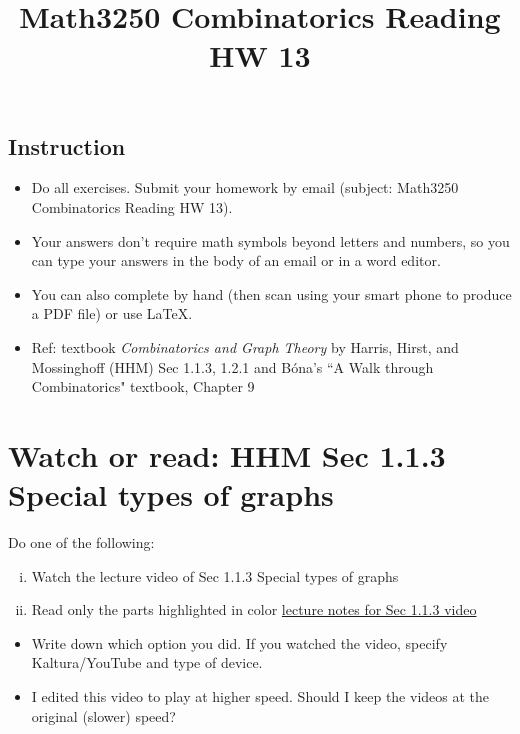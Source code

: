 \documentclass[11pt]{amsart}
\title{Math3250 Combinatorics Reading HW 13}
\begin{document}
\maketitle



\subsection*{Instruction}

\begin{itemize}
\item Do all exercises. 
Submit your homework by email (subject: Math3250 Combinatorics Reading HW 13). 
\item Your answers don't require math symbols beyond letters and numbers, so you can type your answers in the body of an email or in a word editor.
\item 
You can also complete by hand (then scan using your smart phone to produce a PDF file) or use \LaTeX. 
\item
Ref: textbook \emph{Combinatorics and Graph Theory} by Harris, Hirst, and Mossinghoff (HHM) Sec 1.1.3, 1.2.1 and 
 B\'ona's ``A Walk through Combinatorics" textbook, Chapter 9
\end{itemize}






\section{Watch or read: HHM Sec 1.1.3 Special types of graphs}

Do one of the following:
\begin{enumerate}[i.]
	\item Watch the lecture video of Sec 1.1.3 Special types of graphs
	\item Read only the parts highlighted in color  \href{https://egunawan.github.io/combinatorics/notes/notes1_1_3special_types_of_graphs.pdf}{lecture notes for Sec 1.1.3 video}
\end{enumerate}

\begin{itemize}
\item 
Write down which option you did. If you watched the video, specify Kaltura/YouTube and type of device.

\item 
I edited this video to play at higher speed. Should I keep the videos at the original (slower) speed?  
\end{itemize}
\end{document}
